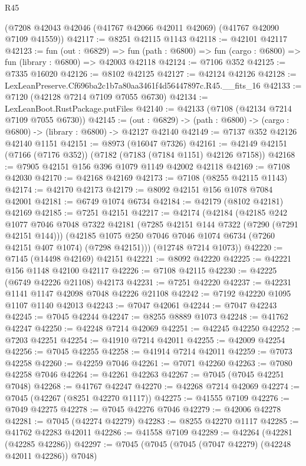 \begin{lexlean}{R45}
\begin{coremodule}
{    (@7208 @42043 @42046 (@41767 @42066 @42011 @42069) (@41767 @42090 @7109 @41559))
@42117 := @8251 @42115 @1143
@42118 := @42101 @42117
@42123 := fun (out : @6829) =>
  fun (path : @6800) => fun (cargo : @6800) => fun (library : @6800) => @42003 @42118
@42124 := @7106 @352
@42125 := @7335 @16020
@42126 := @8102 @42125
@42127 := @42124 @42126
@42128 := LexLeanPreserve.Cf696ba2c1b7a80aa3461f4d56447897c.R45.__fits_16
@42133 := @7120 (@42128 @7214 @7109 @7055 @6730)
@42134 := LexLeanBoot.RustPackage.putFiles
@42140 := @42133 (@7108 (@42134 @7214 @7109 @7055 @6730))
@42145 := (out : @6829) -> (path : @6800) -> (cargo : @6800) -> (library : @6800) -> @42127 @42140
@42149 := @7137 @352 @42126 @42140 @1151
@42151 := @8973 (@16047 @7326)
@42161 := @42149 @42151 (@7166 (@7176 @352)) (@7182 (@7183 (@7184 @1151) @42126 @7158))
@42168 := @7905 @42151 @156 @396 @1079 @1149 @42002 @42118
@42169 := @7108 @42030
@42170 := @42168 @42169
@42173 := @7108 (@8255 @42115 @1143)
@42174 := @42170 @42173
@42179 := @8092 @42151 @156 @1078 @7084 @42001
@42181 := @6749 @1074 @6734
@42184 := @42179 (@8102 @42181) @42169
@42185 := @7251 @42151
@42217 := @42174
    (@42184
      (@42185
        @242
        @1077
        @7046
        @7048
        @7322
        @42181
        (@7285 @42151 @144 @7322 (@7290 (@7291 @42151 @144)))
        (@42185 @1075 @250 @7046 @7046 @1074 @6734 (@7260 @42151 @407 @1074) (@7298 @42151)))
      (@12748 @7214 @1073))
@42220 := @7145 (@14498 @42169) @42151
@42221 := @8092 @42220
@42225 := @42221 @156 @1148 @42100 @42117
@42226 := @7108 @42115
@42230 := @42225 (@6749 @42226 @21108) @42173
@42231 := @7251 @42220
@42237 := @42231 @1141 @1147 @42098 @7048 @42226 @21108
@42242 := @7192 @42220 @1095 @1107 @1140 @42013
@42243 := @7047 @42061
@42244 := @7047 @42243
@42245 := @7045 @42244
@42247 := @8255 @8889 @1073
@42248 := @41762 @42247
@42250 := @42248 @7214 @42069
@42251 := @42245 @42250
@42252 := @7203 @42251
@42254 := @41910 @7214 @42011
@42255 := @42009 @42254
@42256 := @7045 @42255
@42258 := @41914 @7214 @42011
@42259 := @7073 @42258
@42260 := @42259 @7046
@42261 := @7071 @42260
@42263 := @7080 @42258 @7046
@42264 := @42261 @42263
@42267 := @7045 (@7045 @42251 @7048)
@42268 := @41767 @42247
@42270 := @42268 @7214 @42069
@42274 := @7045 (@42267 (@8251 @42270 @1117))
@42275 := @41555 @7109
@42276 := @7049 @42275
@42278 := @7045 @42276 @7046
@42279 := @42006 @42278
@42281 := @7045 (@42274 @42279)
@42283 := @8255 @42270 @1117
@42285 := @41762 @42283 @42011
@42286 := @41558 @7109
@42289 := @42264 (@42281 (@42285 @42286))
@42297 := @7045 (@7045 (@7045 (@7047 @42279) (@42248 @42011 @42286)) @7048)
}
\end{coremodule}
\end{lexlean}
